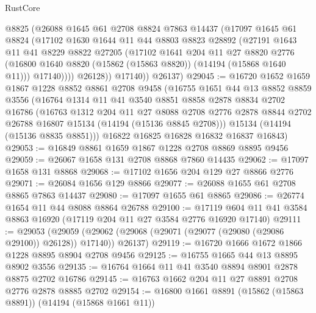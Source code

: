 \begin{lexlean}{RustCore}
\begin{coremodule}
            @8825
            (@26088
              @1645
              @61
              @2708
              @8824
              @7863
              @14437
              (@17097
                @1645
                @61
                @8824
                (@17102
                  @1630
                  @1644
                  @11
                  @44
                  @8803
                  @8823
                  @28892
                  (@27191
                    @1643
                    @11
                    @41
                    @8229
                    @8822
                    @27205
                    (@17102
                      @1641
                      @204
                      @11
                      @27
                      @8820
                      @2776
                      (@16800 @1640 @8820 (@15862 (@15863 @8820)) (@14194 (@15868 @1640 @11)))
                      @17140))))
              @26128))
          @17140))
      @26137)
@29045 := @16720
    @1652
    @1659
    @1867
    @1228
    @8852
    @8861
    @2708
    @9458
    (@16755
      @1651
      @44
      @13
      @8852
      @8859
      @3556
      (@16764
        @1314
        @11
        @41
        @3540
        @8851
        @8858
        @2878
        @8834
        @2702
        @16786
        (@16763
          @1312
          @204
          @11
          @27
          @8088
          @2708
          @2776
          @2878
          @8844
          @2702
          @26788
          @16807
          @15134
          (@14194 (@15136 @8845 @2708)))
        @15134
        (@14194 (@15136 @8835 @8851)))
      @16822
      @16825
      @16828
      @16832
      @16837
      @16843)
@29053 := @16849 @8861 @1659 @1867 @1228 @2708 @8869 @8895 @9456
@29059 := @26067 @1658 @131 @2708 @8868 @7860 @14435
@29062 := @17097 @1658 @131 @8868
@29068 := @17102 @1656 @204 @129 @27 @8866 @2776
@29071 := @26084 @1656 @129 @8866
@29077 := @26088 @1655 @61 @2708 @8865 @7863 @14437
@29080 := @17097 @1655 @61 @8865
@29086 := @26774 @1654 @11 @44 @8088 @8864 @26788
@29100 := @17119 @604 @11 @41 @3584 @8863 @16920 (@17119 @204 @11 @27 @3584 @2776 @16920 @17140)
@29111 := @29053
    (@29059 (@29062 (@29068 (@29071 (@29077 (@29080 (@29086 @29100)) @26128)) @17140)) @26137)
@29119 := @16720 @1666 @1672 @1866 @1228 @8895 @8904 @2708 @9456
@29125 := @16755 @1665 @44 @13 @8895 @8902 @3556
@29135 := @16764 @1664 @11 @41 @3540 @8894 @8901 @2878 @8875 @2702 @16786
@29145 := @16763 @1662 @204 @11 @27 @8891 @2708 @2776 @2878 @8885 @2702
@29154 := @16800 @1661 @8891 (@15862 (@15863 @8891)) (@14194 (@15868 @1661 @11))

\end{coremodule}
\end{lexlean}
